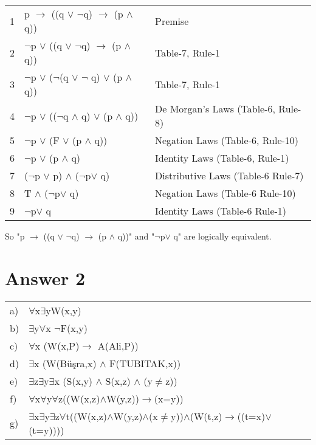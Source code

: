 \documentclass[12pt]{article}
\begin{document}
\begin{table}[H]

\centering

\begin{tabular}{c l l }	
1 & p $\rightarrow$ ((q $\lor$ $\neg$q) $\rightarrow$ (p $\land$ q))& Premise \\
2 & $\neg$p $\lor$ ((q $\lor$ $\neg$q) $\rightarrow$ (p $\land$ q)) & Table-7, Rule-1 \\
3 & $\neg$p $\lor$ ($\neg$(q $\lor$ $\neg$ q) $\lor$ (p $\land$ q)) & Table-7, Rule-1 \\
4 & $\neg$p $\lor$ (($\neg$q $\land$ q) $\lor$ (p $\land$ q)) &  De Morgan's Laws (Table-6, Rule-8) \\
5 & $\neg$p $\lor$ (F $\lor$ (p $\land$ q))& Negation Laws (Table-6, Rule-10) \\
6 & $\neg$p $\lor$  (p $\land$ q)& Identity Laws (Table-6, Rule-1) \\
7 & ($\neg$p $\lor$ p) $\land$ ($\neg$p$\lor$ q)& Distributive Laws (Table-6 Rule-7) \\
8 & T $\land$ ($\neg$p$\lor$ q)& Negation Laws (Table-6 Rule-10) \\
9 & $\neg$p$\lor$ q & Identity Laws (Table-6 Rule-1)\\




\end{tabular}
\end{table}

So "p $\rightarrow$ ((q $\lor$ $\neg$q) $\rightarrow$ (p $\land$ q))" and "$\neg$p$\lor$ q" are logically equivalent.

\section*{Answer 2}

\begin{table}[H]
\centering
\begin{tabular}{l l}

a)& $\forall$x$\exists$yW(x,y)\\
b)& $\exists$y$\forall$x $\neg$F(x,y)\\
c)& $\forall$x (W(x,P)$\rightarrow$ A(Ali,P))\\
d)& $\exists$x (W(Büşra,x) $\land$ F(TUBITAK,x))\\
e)& $\exists$z$\exists$y$\exists$x (S(x,y) $\land$ S(x,z) $\land$ (y$\neq$z))\\
f)& $\forall$x$\forall$y$\forall$z((W(x,z)$\land$W(y,z))$\rightarrow$(x=y))\\
g)&$\exists$x$\exists$y$\exists$z$\forall$t((W(x,z)$\land$W(y,z)$\land$(x$\neq$y))$\land$(W(t,z)$\rightarrow$((t=x)$\lor$(t=y))))
\end{tabular}
\end{table}
\end{document}
